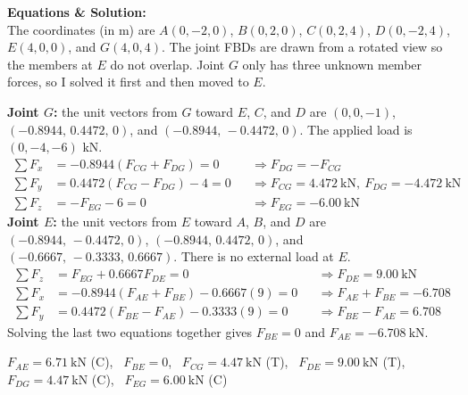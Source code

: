 \documentclass[11pt]{article}
\begin{document}
\clearpage
\textbf{Equations \& Solution:}\\
The coordinates (in m) are $A(0,-2,0)$, $B(0,2,0)$, $C(0,2,4)$, $D(0,-2,4)$, $E(4,0,0)$, and $G(4,0,4)$. The joint FBDs are drawn from a rotated view so the members at $E$ do not overlap. Joint $G$ only has three unknown member forces, so I solved it first and then moved to $E$.

\textbf{Joint $G$:} the unit vectors from $G$ toward $E$, $C$, and $D$ are $(0,0,-1)$, $(-0.8944,\,0.4472,\,0)$, and $(-0.8944,\,-0.4472,\,0)$. The applied load is $(0,-4,-6)$ kN.
\begin{align*}
\textstyle\sum F_x&=-0.8944(F_{CG}+F_{DG})=0 &&\Rightarrow F_{DG}=-F_{CG}\\
\textstyle\sum F_y&=0.4472(F_{CG}-F_{DG})-4=0 &&\Rightarrow F_{CG}=\SI{4.472}{\kN},\ F_{DG}=\SI{-4.472}{\kN}\\
\textstyle\sum F_z&=-F_{EG}-6=0 &&\Rightarrow F_{EG}=\SI{-6.00}{\kN}
\end{align*}
\textbf{Joint $E$:} the unit vectors from $E$ toward $A$, $B$, and $D$ are $(-0.8944,\,-0.4472,\,0)$, $(-0.8944,\,0.4472,\,0)$, and $(-0.6667,\,-0.3333,\,0.6667)$. There is no external load at $E$.
\begin{align*}
\textstyle\sum F_z&=F_{EG}+0.6667F_{DE}=0 &&\Rightarrow F_{DE}=\SI{9.00}{\kN}\\
\textstyle\sum F_x&=-0.8944(F_{AE}+F_{BE})-0.6667(9)=0 &&\Rightarrow F_{AE}+F_{BE}=-6.708\\
\textstyle\sum F_y&=0.4472(F_{BE}-F_{AE})-0.3333(9)=0 &&\Rightarrow F_{BE}-F_{AE}=6.708
\end{align*}
Solving the last two equations together gives $F_{BE}=0$ and $F_{AE}=\SI{-6.708}{\kN}$.

\begin{finalanswer}
$F_{AE}=\SI{6.71}{\kN}$ (C), \ $F_{BE}=0$, \ $F_{CG}=\SI{4.47}{\kN}$ (T), \ $F_{DE}=\SI{9.00}{\kN}$ (T), \ $F_{DG}=\SI{4.47}{\kN}$ (C), \ $F_{EG}=\SI{6.00}{\kN}$ (C)
\end{finalanswer}
\end{document}
